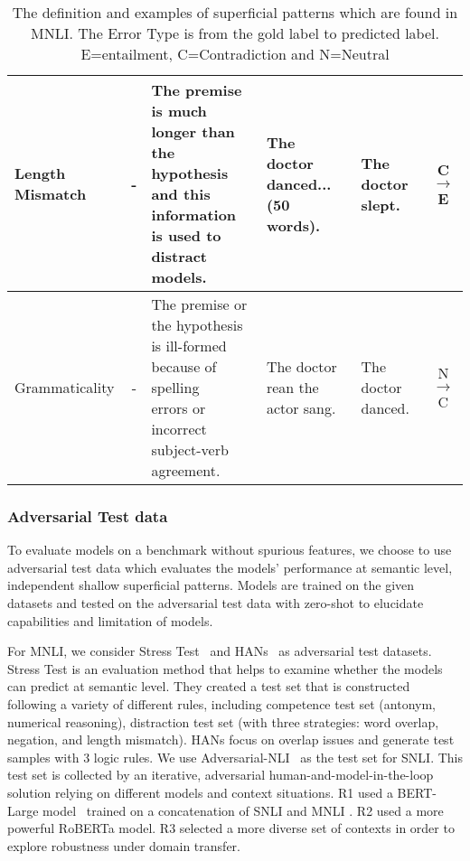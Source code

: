 \begin{table}[]
{\begin{tabular}{|l|c|l|l|l|c|}
Length Mismatch          & -                                    & \tabincell{l}{The premise is much longer than \\the hypothesis and this information \\is used to distract models. }            & The doctor danced...(50 words).     & The doctor slept.                      & C$\rightarrow$E        \\ \hline
Grammaticality           & -                                    & \tabincell{l}{The premise or the hypothesis \\is ill-formed because of spelling \\errors or incorrect subject-verb \\agreement.} & The doctor rean the actor sang.     & The doctor danced.                     & N$\rightarrow$C        \\ \hline
\end{tabular}}
	\caption{The definition and examples of superficial patterns which are found in MNLI. 
	The Error Type is from the gold label to predicted label. E=entailment, C=Contradiction and N=Neutral}
	\label{tab:cues}
\end{table}

\subsubsection{Adversarial Test data}
To evaluate models on a benchmark without spurious features, 
we choose to use adversarial test data which
 evaluates the models' performance at semantic level, independent shallow superficial patterns. 
Models are trained on the given datasets and tested on 
the adversarial test data with zero-shot to
 elucidate capabilities and limitation of models.
 
For MNLI, we consider Stress Test~\cite{} and HANs~\cite{} as adversarial 
test datasets. Stress Test is an evaluation method that helps to examine whether the
models can predict  at semantic level. 
They  created a test
set that is constructed following a variety of different rules,
including competence test set (antonym, numerical reasoning),
distraction test set (with three strategies: word overlap,
negation, and length mismatch). 
HANs focus on overlap issues and 
generate test samples with 3 logic rules. 
We use Adversarial-NLI~\cite{} as the test set for SNLI. 
This test set is collected by an iterative, adversarial human-and-model-in-the-loop 
solution relying on different models and context situations. 
R1 used a BERT-Large model~\cite{} trained on a concatenation of SNLI and MNLI
. 
R2 used a more powerful RoBERTa model. R3 selected a more diverse set of contexts
in order to explore robustness under domain transfer. 

